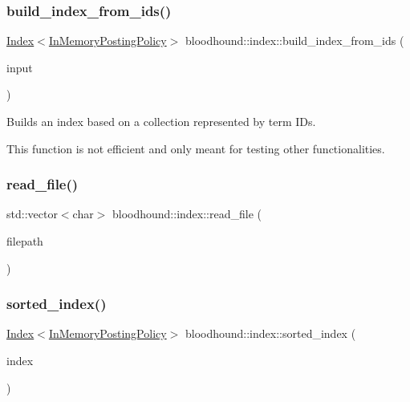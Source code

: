 \subsubsection{\texorpdfstring{build\+\_\+index\+\_\+from\+\_\+ids()}{build\_index\_from\_ids()}}
{\footnotesize\ttfamily \hyperlink{classbloodhound_1_1index_1_1Index}{Index}$<$\hyperlink{classbloodhound_1_1index_1_1InMemoryPostingPolicy}{In\+Memory\+Posting\+Policy}$>$ bloodhound\+::index\+::build\+\_\+index\+\_\+from\+\_\+ids (\begin{DoxyParamCaption}\item[{const std\+::vector$<$ std\+::vector$<$ \hyperlink{structbloodhound_1_1TermWeight}{Term\+Weight} $>$$>$ \&}]{input }\end{DoxyParamCaption})}

Builds an index based on a collection represented by term I\+Ds.

This function is not efficient and only meant for testing other functionalities. \mbox{\label{namespacebloodhound_1_1index_a4b6f89a17c10bf2927aff24df7081bb3}} 
\subsubsection{\texorpdfstring{read\+\_\+file()}{read\_file()}}
{\footnotesize\ttfamily std\+::vector$<$char$>$ bloodhound\+::index\+::read\+\_\+file (\begin{DoxyParamCaption}\item[{fs\+::path}]{filepath }\end{DoxyParamCaption})}

\mbox{\label{namespacebloodhound_1_1index_a306f62c55e8d06a9703f552f7cf312c5}} 
\subsubsection{\texorpdfstring{sorted\+\_\+index()}{sorted\_index()}}
{\footnotesize\ttfamily \hyperlink{classbloodhound_1_1index_1_1Index}{Index}$<$\hyperlink{classbloodhound_1_1index_1_1InMemoryPostingPolicy}{In\+Memory\+Posting\+Policy}$>$ bloodhound\+::index\+::sorted\+\_\+index (\begin{DoxyParamCaption}\item[{const \hyperlink{classbloodhound_1_1index_1_1Index}{Index}$<$ \hyperlink{classbloodhound_1_1index_1_1InMemoryPostingPolicy}{In\+Memory\+Posting\+Policy} $>$ \&}]{index }\end{DoxyParamCaption})}

